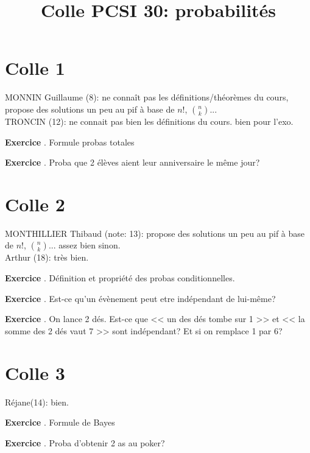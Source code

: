 \documentclass[10pt,a4paper]{article}
\title{Colle PCSI 30: probabilités}
\newcounter{question}
\newcounter{exo}
\newenvironment{exo}{\vspace{0.5cm}\setcounter{question}{0}\addtocounter{exo}{1} \noindent \textbf{Exercice \theexo}. \normalsize }{\par}
\begin{document}
	\maketitle
	
	\section*{Colle 1}
	MONNIN Guillaume (8): ne connaît pas les définitions/théorèmes du cours, propose des solutions un peu au pif à base de $n!$, $\binom{n}{k}$...\\
	TRONCIN (12): ne connait pas bien les définitions du cours. bien pour l'exo.\\
	
	\setcounter{exo}{0}
	
	\begin{exo}
		Formule probas totales
	\end{exo}
	\begin{exo}
		Proba que 2 élèves aient leur anniversaire le même jour?
	\end{exo}

	\section*{Colle 2}

	\setcounter{exo}{0}
	MONTHILLIER Thibaud (note: 13): propose des solutions un peu au pif à base de $n!$, $\binom{n}{k}$... assez bien sinon.\\
	Arthur (18): très bien.\\
	
	\begin{exo}
		Définition et propriété des probas conditionnelles.
	\end{exo}
		
	\begin{exo}
		Est-ce qu'un évènement peut etre indépendant de lui-même?
	\end{exo}	
	
	\begin{exo}
		On lance 2 dés. Est-ce que << un des dés tombe sur 1 >> et << la somme des 2 dés vaut 7 >> sont indépendant? Et si on remplace 1 par 6? 
	\end{exo}	
	
	\section*{Colle 3}
	\setcounter{exo}{0}
	Réjane(14): bien.\\
	
	\begin{exo}
		Formule de Bayes
	\end{exo}

	\begin{exo}
		Proba d'obtenir 2 as au poker?	
	\end{exo}
	
\end{document}
